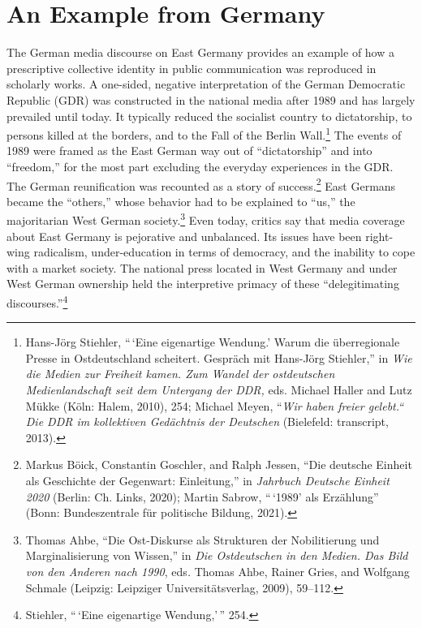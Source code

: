 \documentclass{tufte-handout}
\begin{document}
\hypertarget{an-example-from-germany}{%
\section{An Example from Germany}\label{an-example-from-germany}}

The German media discourse on East Germany provides an example of how a
prescriptive collective identity in public communication was reproduced
in scholarly works. A one-sided, negative interpretation of the German
Democratic Republic (GDR) was constructed in the national media after
1989 and has largely prevailed until today. It typically reduced the
socialist country to dictatorship, to persons killed at the borders, and
to the Fall of the Berlin Wall.\footnote{Hans-Jörg Stiehler, ``\,`Eine eigenartige Wendung.' Warum die
  überregionale Presse in Ostdeutschland scheitert. Gespräch mit
  Hans-Jörg Stiehler,'' in \emph{Wie die Medien zur Freiheit kamen. Zum
  Wandel der ostdeutschen Medienlandschaft seit dem Untergang der DDR,}
  eds. Michael Haller and Lutz Mükke (Köln: Halem, 2010), 254; Michael
  Meyen, ``\emph{Wir haben freier gelebt.`` Die DDR im kollektiven
  Gedächtnis der Deutschen} (Bielefeld: transcript, 2013).
}
The events of 1989 were framed as the East German way out of
``dictatorship'' and into ``freedom,'' for the most part excluding the
everyday experiences in the GDR. The German reunification was recounted
as a story of success.\footnote{Markus Böick, Constantin Goschler, and Ralph Jessen, ``Die deutsche
  Einheit als Geschichte der Gegenwart: Einleitung,'' in \emph{Jahrbuch
  Deutsche Einheit} \emph{2020} (Berlin: Ch. Links, 2020); Martin
  Sabrow, ``\,`1989' als Erzählung'' (Bonn: Bundeszentrale für
  politische Bildung, 2021).
} East
Germans became the ``others,'' whose behavior had to be explained to
``us,'' the majoritarian West German
society.\footnote{Thomas Ahbe, ``Die Ost-Diskurse als Strukturen der Nobilitierung und
  Marginalisierung von Wissen,'' in \emph{Die Ostdeutschen in den
  Medien. Das Bild von den Anderen nach 1990}, eds\emph{.} Thomas Ahbe,
  Rainer Gries, and Wolfgang Schmale (Leipzig: Leipziger
  Universitätsverlag, 2009), 59--112.
} Even today, critics say
that media coverage about East Germany is pejorative and unbalanced. Its
issues have been right-wing radicalism, under-education in terms of
democracy, and the inability to cope with a market society. The national
press located in West Germany and under West German ownership held the
interpretive primacy of these ``delegitimating
discourses.''\footnote{Stiehler, ``\,`Eine eigenartige Wendung,'\,'' 254.
}
\end{document}
